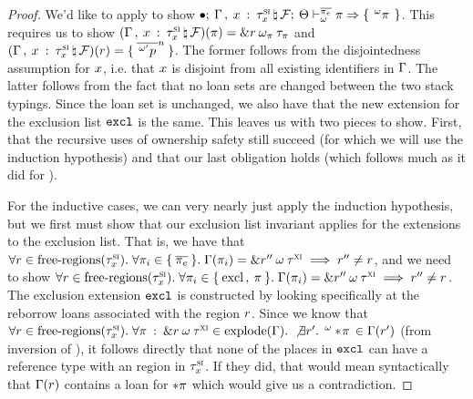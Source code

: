 \begin{proof}
  \vspace{1em}
  \noindent \framebox[\textwidth]{ \figuresize
    \begin{mathpar}
      \ODeref
    \end{mathpar}
  } \vspace{1em}

  We'd like to apply  to show $\bullet; \: 
    \Gamma \, , \: x \: : \: \tau^\textsc{si}_x
     \, \natural \, \mathcal{F} ; \: \Theta \vdash^{ \overline{\pi_e} }_{\omega}  \pi  \Rightarrow 
    \{ \: \,^{\omega}\pi\, \: \} $. This requires us to show
  $(
      \Gamma \, , \: x \: : \: \tau^\textsc{si}_x
     \, \natural \, \mathcal{F}) (\pi) = 
    \& r \: \omega_\pi \: \tau_\pi$ and $
    (
      \Gamma \, , \: x \: : \: \tau^\textsc{si}_x
     \, \natural \, \mathcal{F}) (r) = 
    \{ \: \overline{\,^{\omega^\prime}p\,}^n \: \}$. The former
  follows from the disjointedness assumption for $x$, i.e. that $x$ is
  disjoint from all existing identifiers in $\Gamma$. The latter follows from
  the fact that no loan sets are changed between the two stack typings. Since
  the loan set is unchanged, we also have that the new extension for the
  exclusion list $\mathtt{excl}$ is the same. This leaves us with two pieces to
  show. First, that the recursive uses of ownership safety still succeed (for
  which we will use the induction hypothesis) and that our last obligation holds
  (which follows much as it did for ).

  For the inductive cases, we can very nearly just apply the induction
  hypothesis, but we first must show that our exclusion list invariant applies
  for the extensions to the exclusion list. That is, we have that $\forall
  r \in \textrm{free-regions}(\tau^\textsc{si}_x). \; \forall \pi_i \in
  \{ \: \overline{\pi_e} \: \}. \; \Gamma(\pi_i) =
  \& r^{\prime\prime} \: \omega \: \tau^\textsc{xi} \implies
  r^{\prime\prime} \neq r$, and we need to show $\forall r
  \in \textrm{free-regions}(\tau^\textsc{si}_x). \; \forall \pi_i \in \{ \: \textrm{excl}
    \, , \: \pi \: \}. \; \Gamma(\pi_i) =
  \& r^{\prime\prime} \: \omega \: \tau^\textsc{xi} \implies
  r^{\prime\prime} \neq r$. The exclusion extension $\mathtt{excl}$
  is constructed by looking specifically at the reborrow loans associated with
  the region $r$. Since we know that $\forall r \in
  \textrm{free-regions}(\tau^\textsc{si}_x). \; \forall
  \pi \: : \: \& r \: \omega \: \tau^\textsc{xi} \in
  \textrm{explode}(\Gamma). \; \not\exists r^\prime. \;
  \,^{\omega}* \! \pi\, \in \Gamma(r^\prime)$
  (from inversion of ), it
  follows directly that none of the places in $\mathtt{excl}$ can have a
  reference type with an region in $\tau^\textsc{si}_x$. If they did, that would
  mean syntactically that $\Gamma(r)$ contains a loan for
  $* \pi$ which would give us a contradiction.


\end{proof}
